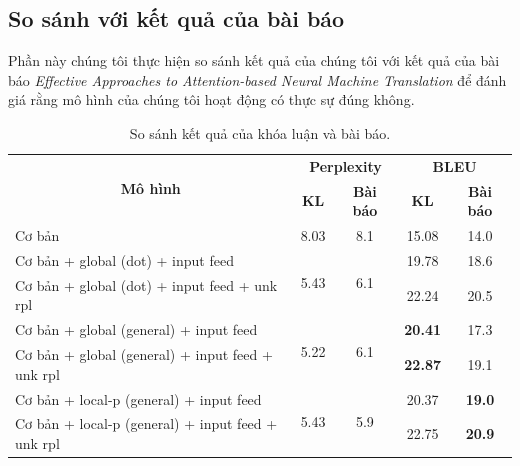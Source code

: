 \subsection{So sánh với kết quả của bài báo}
Phần này chúng tôi thực hiện so sánh kết quả của chúng tôi với kết quả của bài báo \textit{Effective Approaches to Attention-based Neural Machine Translation} để đánh giá rằng mô hình của chúng tôi hoạt động có thực sự đúng không.

\begin{table}
	\centering
	\begin{tabular}{|l|c|c|c|c|} 
		\hline
		\multicolumn{1}{|c|}{\multirow{2}{*}{\textbf{Mô hình} }} & \multicolumn{2}{c|}{\textbf{Perplexity }}    & \multicolumn{2}{c|}{\textbf{BLEU }}  \\ 
		\cline{2-5}
		\multicolumn{1}{|c|}{}                                   & \textbf{KL}           & \textbf{Bài báo}     & \textbf{KL}    & \textbf{Bài báo}    \\ 
		\hline
		Cơ bản                                                   & 8.03                  & 8.1                  & 15.08          & 14.0                \\ 
		\hline
		Cơ bản + global (dot) + input feed                       & \multirow{2}{*}{5.43} & \multirow{2}{*}{6.1} & 19.78          & 18.6                \\ 
		\cline{1-1}\cline{4-5}
		Cơ bản + global (dot) + input feed + unk rpl             &                       &                      & 22.24          & 20.5                \\ 
		\hline
		Cơ bản + global (general) + input feed                   & \multirow{2}{*}{5.22} & \multirow{2}{*}{6.1} & \textbf{20.41} & 17.3                \\ 
		\cline{1-1}\cline{4-5}
		Cơ bản + global (general) + input feed + unk rpl         &                       &                      & \textbf{22.87} & 19.1                \\ 
		\hline
		Cơ bản + local-p (general) + input feed                  & \multirow{2}{*}{5.43} & \multirow{2}{*}{5.9} & 20.37          & \textbf{19.0}       \\ 
		\cline{1-1}\cline{4-5}
		Cơ bản + local-p (general) + input feed + unk rpl        &                       &                      & 22.75          & \textbf{20.9}       \\
		\hline
	\end{tabular}
	\caption{So sánh kết quả của khóa luận và bài báo.}
	\label{tab_thesis-paper}
\end{table}

